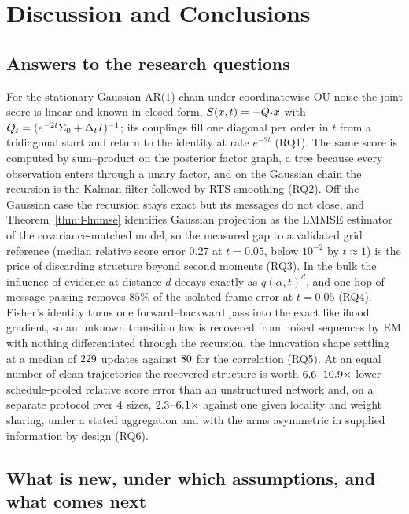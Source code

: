 \chapter{Discussion and Conclusions}\label{ch:conclusions}

\section{Answers to the research questions}\label{sec:conclusions-findings}

For the stationary Gaussian AR(1) chain under coordinatewise OU noise the
joint score is linear and known in closed form, $S(x,t) = -Q_t x$ with
$Q_t = (e^{-2t}\Sigma_0 + \Delta_t I)^{-1}$; its couplings fill one diagonal
per order in $t$ from a tridiagonal start and return to the identity at rate
$e^{-2t}$ (RQ1). The same score is computed by sum--product on the posterior
factor graph, a tree because every observation enters through a unary
factor, and on the Gaussian chain the recursion is the Kalman filter followed
by RTS smoothing (RQ2). Off the Gaussian case the recursion stays exact but
its messages do not close, and Theorem~\ref{thm:l-lmmse} identifies Gaussian
projection as the LMMSE estimator of the covariance-matched model, so the
measured gap to a validated grid reference (median relative score error
$0.27$ at $t = 0.05$, below $10^{-2}$ by $t \approx 1$) is the price of
discarding structure beyond second moments (RQ3). In the bulk the influence
of evidence at distance $d$ decays exactly as $q(\alpha,t)^d$, and one hop of
message passing removes $85\%$ of the isolated-frame error at $t = 0.05$
(RQ4). Fisher's identity turns one forward--backward pass into the exact
likelihood gradient, so an unknown transition law is recovered from noised
sequences by EM with nothing differentiated through the recursion, the
innovation shape settling at a median of $229$ updates against
$80$ for the correlation (RQ5). At an equal number of clean
trajectories the recovered structure is worth $6.6$--$10.9\times$
lower schedule-pooled relative score error than an unstructured network and,
on a separate protocol over $4$ sizes,
$2.3$--$6.1\times$ against one given locality and
weight sharing, under a stated aggregation and with the arms asymmetric in
supplied information by design (RQ6).

\section{What is new, under which assumptions, and what comes next}

